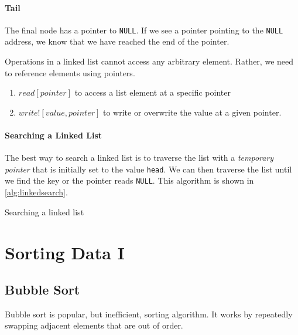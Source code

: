 \paragraph{Tail} The final node has a pointer to \texttt{NULL}. If we see a pointer pointing to the \texttt{NULL} address, we know that we have reached the end of the pointer.

Operations in a linked list cannot access any arbitrary element. Rather, we need to reference elements using pointers.

\begin{enumerate}
	\item \( read[pointer] \) to access a list element at a specific pointer  
	\item \( write![value,pointer] \) to write or overwrite the value at a given pointer.
\end{enumerate}

\paragraph{Searching a Linked List} The best way to search a linked list is to traverse the list with a \emph{temporary pointer} that is initially set to the value \texttt{head}. We can then traverse the list until we find the key or the pointer reads \texttt{NULL}. This algorithm is shown in \autoref{alg:linkedsearch}.

\begin{algorithm}[H]
	\caption{Searching a linked list}\label{alg:linkedsearch}
	\begin{algorithmic}
		\EndWhile{}
		\EndFunction{}
	\end{algorithmic}
\end{algorithm}



\section{Sorting Data I}
\subsection{Bubble Sort}
Bubble sort is popular, but inefficient, sorting algorithm. It works by repeatedly swapping adjacent elements that are out of order.

